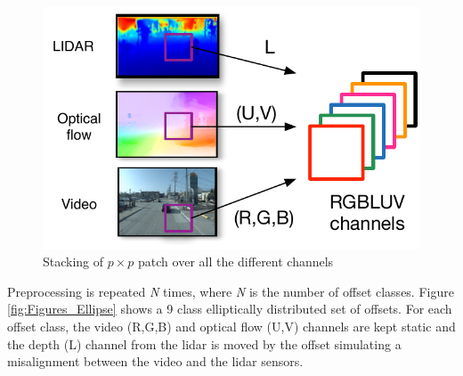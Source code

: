 \documentclass{article}
\begin{document}
\begin{figure}[htbp]
    \centering
        \includegraphics[scale=0.65]{Figures/ImagePatchChannel.pdf}
    \caption{Stacking of $p\times p$ patch over all the different channels}
    \label{fig:ImageChStride}
\end{figure}

%
%

Preprocessing is repeated \emph{N} times, where \emph{N} is the number of offset classes. Figure \ref{fig:Figures_Ellipse} shows a 9 class elliptically distributed set of offsets. For each offset class, the video (R,G,B) and optical flow (U,V) channels are kept static and the depth (L) channel from the lidar is moved by the offset simulating a misalignment between the video and the lidar sensors. 
\end{document}
